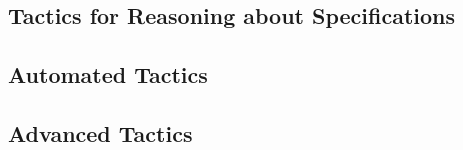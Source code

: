 















\subsection{Tactics for Reasoning about Specifications}














\subsection{Automated Tactics}
\label{subsec:automatedtactics}




\subsection{Advanced Tactics}
\label{subsec:advancedtactics}



